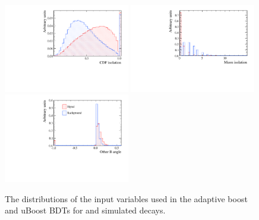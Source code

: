 \begin{figure}[htbp]
    \includegraphics[width=0.49\textwidth]{./Figs/Appendix2/CDF.pdf}
    \includegraphics[width=0.49\textwidth]{./Figs/Appendix2/muon_iso.pdf}
    \includegraphics[width=0.49\textwidth]{./Figs/Appendix2/B_other_angle.pdf}
  \caption{The distributions of the input variables used in the adaptive boost and uBoost BDTs for \bsmumu and  simulated decays.}
  \label{fig:myBDTvars}
\end{figure}



